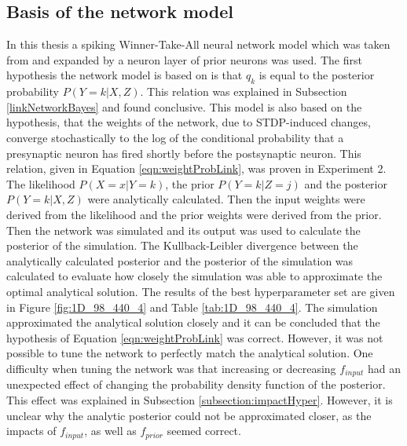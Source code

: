 \subsection{Basis of the network model}
\label{basisOfModel}
In this thesis a spiking Winner-Take-All neural network model which was taken from \citet{nessler} and expanded by a neuron layer of prior neurons was used. The first hypothesis the network model is based on is that $q_k$ is equal to the posterior probability $P(Y = k|X, Z)$. This relation was explained in Subsection \ref{linkNetworkBayes} and found conclusive. This model is also based on the hypothesis, that the weights of the network, due to STDP-induced changes, converge stochastically to the log of the conditional probability that a presynaptic neuron has fired shortly before the postsynaptic neuron. This relation, given in Equation \ref{eqn:weightProbLink}, was proven in Experiment 2. The likelihood $P(X=x|Y=k)$, the prior $P(Y=k|Z=j)$ and the posterior $P(Y = k|X, Z)$ were analytically calculated. Then the input weights were derived from the likelihood and the prior weights were derived from the prior. Then the network was simulated and its output was used to calculate the posterior of the simulation. The Kullback-Leibler divergence between the analytically calculated posterior and the posterior of the simulation was calculated to evaluate how closely the simulation was able to approximate the optimal analytical solution. The results of the best hyperparameter set are given in Figure \ref{fig:1D_98_440_4} and Table \ref{tab:1D_98_440_4}. The simulation approximated the analytical solution closely and it can be concluded that the hypothesis of Equation \ref{eqn:weightProbLink} was correct. However, it was not possible to tune the network to perfectly match the analytical solution. One difficulty when tuning the network was that increasing or decreasing $f_{input}$ had an unexpected effect of changing the probability density function of the posterior. This effect was explained in Subsection \ref{subsection:impactHyper}. However, it is unclear why the analytic posterior could not be approximated closer, as the impacts of $f_{input}$, as well as $f_{prior}$ seemed correct.

